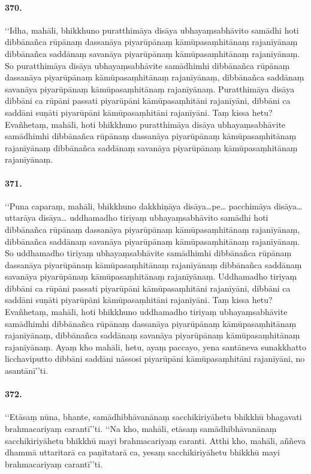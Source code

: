 \paragraph{370.} ‘‘Idha, mahāli, bhikkhuno puratthimāya disāya ubhayaṃsabhāvito samādhi hoti dibbānañca rūpānaṃ dassanāya piyarūpānaṃ kāmūpasaṃhitānaṃ rajanīyānaṃ dibbānañca saddānaṃ savanāya piyarūpānaṃ kāmūpasaṃhitānaṃ rajanīyānaṃ. So puratthimāya disāya ubhayaṃsabhāvite samādhimhi dibbānañca rūpānaṃ dassanāya piyarūpānaṃ kāmūpasaṃhitānaṃ rajanīyānaṃ, dibbānañca saddānaṃ savanāya piyarūpānaṃ kāmūpasaṃhitānaṃ rajanīyānaṃ. Puratthimāya disāya dibbāni ca rūpāni passati piyarūpāni kāmūpasaṃhitāni rajanīyāni, dibbāni ca saddāni suṇāti piyarūpāni kāmūpasaṃhitāni rajanīyāni. Taṃ kissa hetu? Evañhetaṃ, mahāli, hoti bhikkhuno puratthimāya disāya ubhayaṃsabhāvite samādhimhi dibbānañca rūpānaṃ dassanāya piyarūpānaṃ kāmūpasaṃhitānaṃ rajanīyānaṃ dibbānañca saddānaṃ savanāya piyarūpānaṃ kāmūpasaṃhitānaṃ rajanīyānaṃ.

\paragraph{371.} ‘‘Puna caparaṃ, mahāli, bhikkhuno dakkhiṇāya disāya…pe… pacchimāya disāya… uttarāya disāya… uddhamadho tiriyaṃ ubhayaṃsabhāvito samādhi hoti dibbānañca rūpānaṃ dassanāya piyarūpānaṃ kāmūpasaṃhitānaṃ rajanīyānaṃ, dibbānañca saddānaṃ savanāya piyarūpānaṃ kāmūpasaṃhitānaṃ rajanīyānaṃ. So uddhamadho tiriyaṃ ubhayaṃsabhāvite samādhimhi dibbānañca rūpānaṃ dassanāya piyarūpānaṃ kāmūpasaṃhitānaṃ rajanīyānaṃ dibbānañca saddānaṃ savanāya piyarūpānaṃ kāmūpasaṃhitānaṃ rajanīyānaṃ. Uddhamadho tiriyaṃ dibbāni ca rūpāni passati piyarūpāni kāmūpasaṃhitāni rajanīyāni, dibbāni ca saddāni suṇāti piyarūpāni kāmūpasaṃhitāni rajanīyāni. Taṃ kissa hetu? Evañhetaṃ, mahāli, hoti bhikkhuno uddhamadho tiriyaṃ ubhayaṃsabhāvite samādhimhi dibbānañca rūpānaṃ dassanāya piyarūpānaṃ kāmūpasaṃhitānaṃ rajanīyānaṃ, dibbānañca saddānaṃ savanāya piyarūpānaṃ kāmūpasaṃhitānaṃ rajanīyānaṃ. Ayaṃ kho mahāli, hetu, ayaṃ paccayo, yena santāneva sunakkhatto licchaviputto dibbāni saddāni nāssosi piyarūpāni kāmūpasaṃhitāni rajanīyāni, no asantānī’’ti.

\paragraph{372.} ‘‘Etāsaṃ nūna, bhante, samādhibhāvanānaṃ sacchikiriyāhetu bhikkhū bhagavati brahmacariyaṃ carantī’’ti. ‘‘Na kho, mahāli, etāsaṃ samādhibhāvanānaṃ sacchikiriyāhetu bhikkhū mayi brahmacariyaṃ caranti. Atthi kho, mahāli, aññeva dhammā uttaritarā ca paṇītatarā ca, yesaṃ sacchikiriyāhetu bhikkhū mayi brahmacariyaṃ carantī’’ti.

